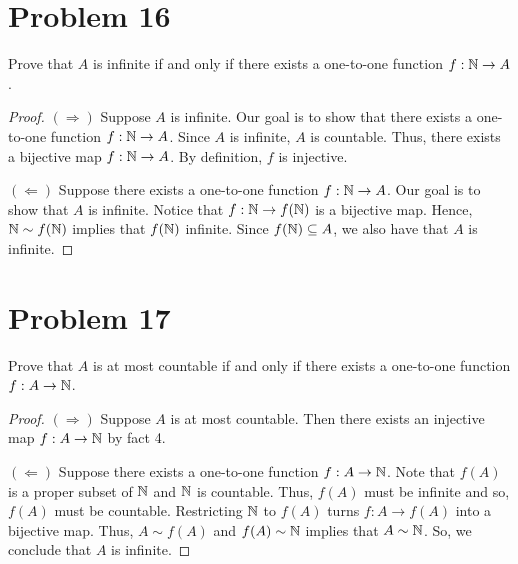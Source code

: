 \documentclass[11pt,a4paper]{article}
\begin{document}
\section*{Problem 16} Prove that \( A  \) is infinite if and only if there exists a one-to-one function \( f: \mathbb{N} \to A  \). 
\begin{proof}
\( (\Rightarrow) \) Suppose \( A  \) is infinite. Our goal is to show that there exists a one-to-one function \( f: \mathbb{N} \to A  \). Since \( A  \) is infinite, \( A  \) is countable. Thus, there exists a bijective map \( f: \mathbb{N} \to A  \). By definition, \( f \) is injective.

\( (\Leftarrow) \) Suppose there exists a one-to-one function \( f: \mathbb{N} \to A  \). Our goal is to show that \( A  \) is infinite. Notice that \( f: \mathbb{N} \to f(\mathbb{N}) \) is a bijective map. Hence, \( \mathbb{N} \sim f(\mathbb{N})  \) implies that \( f(\mathbb{N}) \) infinite. Since \( f(\mathbb{N}) \subseteq  A  \), we also have that \( A  \) is infinite.
\end{proof}

\section*{Problem 17} Prove that \( A  \) is at most countable if and only if there exists a one-to-one function \( f: A \to \mathbb{N}  \).
\begin{proof}
\( (\Rightarrow) \) Suppose \( A  \) is at most countable. Then there exists an injective map \( f: A \to \mathbb{N}  \) by fact 4.

\( (\Leftarrow) \) Suppose there exists a one-to-one function \( f: A \to \mathbb{N} \). Note that \( f(A)    \) is a proper subset of \( \mathbb{N} \) and \( \mathbb{N}  \) is countable. Thus, \( f(A)  \) must be infinite and so, \( f(A) \) must be countable. Restricting \( \mathbb{N}  \) to \( f(A) \) turns \( f: A \to f(A) \) into a bijective map. Thus, \( A \sim f(A) \) and \( f(A) \sim \mathbb{N} \) implies that \( A \sim \mathbb{N}  \). So, we conclude that \( A  \) is infinite.
\end{proof}
\end{document}
